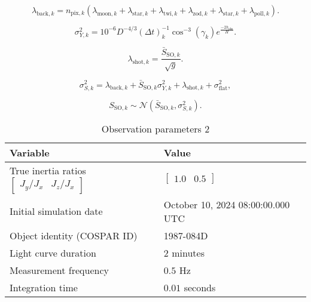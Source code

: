 \documentclass[a4paper,twocolumn]{spaceDebrisC} %
\begin{document}
\begin{equation}
  \lambda_{\text{back},k} = n_{\text{pix},k} \left( \lambda_{\text{moon},k} + \lambda_{\text{star},k} + \lambda_{\text{twi},k} + \lambda_{\text{zod},k} + \lambda_{\text{star},k} + \lambda_{\text{poll},k} \right).
\end{equation}

\begin{equation} \label{eq:scint_noise}
  \sigma^2_{Y,k} = 10^{-6} D^{-4/3} (\Delta t)_k^{-1} \cos^{-3}\left(\gamma_k\right) e^{\frac{-2h_\text{obs}}{H}}.
\end{equation}

\begin{equation}
  \lambda_{\text{shot},k} = \frac{\bar{S}_{\text{SO},k}}{\sqrt{g}}.
\end{equation}

\begin{equation} \label{eq:sigma_total}
  \sigma^2_{S,k} = \lambda_{\text{back},k} + \bar{S}_{\text{SO},k} \sigma^2_{Y,k} + \lambda_{\text{shot},k} + \sigma^2_\text{flat},
\end{equation}

\begin{equation}
  S_{\text{SO},k} \sim \mathcal{N}\left( \bar{S}_{\text{SO},k}, \sigma^2_{S,k} \right).
 \end{equation}

 \begin{table}[ht]
  \centering
  \caption{Observation parameters 2}
  \vspace*{6pt}
  \begin{tabular}{|l|l|}
  \hline
  \textbf{Variable} & \textbf{Value} \\ \hline
  True inertia ratios $\begin{bmatrix}J_y / J_x & J_z / J_x\end{bmatrix}$ & $\begin{bmatrix} 1.0 & 0.5 \end{bmatrix}$ \\ \hline
  Initial simulation date & October 10, 2024 08:00:00.000 UTC \\ \hline
  Object identity (COSPAR ID) & 1987-084D \\ \hline 
 Light curve duration & $2$ minutes \\ \hline
 Measurement frequency & $0.5$ Hz \\ \hline
 Integration time & $0.01$ seconds \\ \hline
  \end{tabular}
  \label{tb:case1_in}
\end{table}
\end{document}
